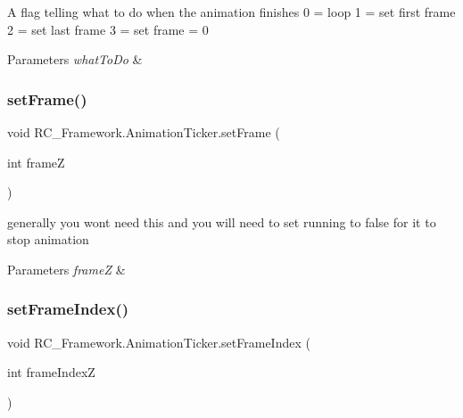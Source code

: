 A flag telling what to do when the animation finishes 0 = loop 1 = set first frame 2 = set last frame 3 = set frame = 0 


\begin{DoxyParams}{Parameters}
{\em what\+To\+Do} & \\
\hline
\end{DoxyParams}
\mbox{\label{class_r_c___framework_1_1_animation_ticker_ab35ac03afdb37b3f59a15eb08c7daa0f}} 
\subsubsection{\texorpdfstring{set\+Frame()}{setFrame()}}
{\footnotesize\ttfamily void R\+C\+\_\+\+Framework.\+Animation\+Ticker.\+set\+Frame (\begin{DoxyParamCaption}\item[{int}]{frameZ }\end{DoxyParamCaption})}



generally you wont need this and you will need to set running to false for it to stop animation 


\begin{DoxyParams}{Parameters}
{\em frameZ} & \\
\hline
\end{DoxyParams}
\mbox{\label{class_r_c___framework_1_1_animation_ticker_a651ebc93d3b81476de57192aa0ed7ac0}} 
\subsubsection{\texorpdfstring{set\+Frame\+Index()}{setFrameIndex()}}
{\footnotesize\ttfamily void R\+C\+\_\+\+Framework.\+Animation\+Ticker.\+set\+Frame\+Index (\begin{DoxyParamCaption}\item[{int}]{frame\+IndexZ }\end{DoxyParamCaption})}



